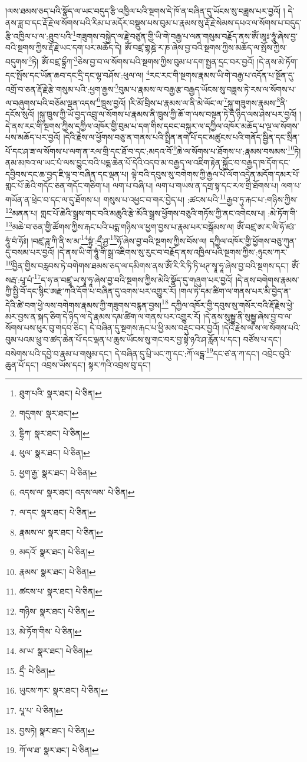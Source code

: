 །ལས་ཐམས་ཅད་པའི་སྣོད་ལ་ཡང་བདུད་རྩི་འཁྱིལ་པའི་སྔགས་དེ་ཁོ་ན་བཞིན་དུ་ཡོངས་སུ་བཟླས་པར་བྱའོ། །
དེ་ནས་ཟླ་བ་དང་རྡོ་རྗེ་ལ་སོགས་པའི་རིམ་པ་མདོར་བསྡུས་པས་བུམ་པ་རྣམས་སུ་རྡོ་རྗེ་སེམས་དཔའ་ལ་སོགས་པ་བདུད་རྩི་འཁྱིལ་པ་ལ་:ཐུབ་པའི་\footnote{ཐུག་པའི་  སྣར་ཐང་།  པེ་ཅིན། }གཟུགས་བསྐྱེད་ལ་རྗེ་བཙུན་གྱི་ཡི་གེ་བརྒྱ་པ་ལན་གསུམ་བརྗོད་ནས་ཨོཾ་ཨཱཿ་ཧཱུཾ་ཞེས་བྱ་བའི་སྔགས་ཀྱིས་རྡོ་རྗེ་ཡང་དག་པར་མཆོད་དེ། ཨོཾ་བཛྲ་གྷཎྜེ་ར་ཎ་ཞེས་བྱ་བའི་སྔགས་ཀྱིས་མཆོད་ལ་སྤོས་ཀྱིས་བདུགས་\footnote{གདུགས་  སྣར་ཐང་། }ཏེ། ཨོཾ་བཛྲ་དྷྲྀཀ་\footnote{དྷྲིཀ་  སྣར་ཐང་།  པེ་ཅིན། }ཅེས་བྱ་བ་ལ་སོགས་པའི་སྔགས་ཀྱིས་བུམ་པ་དག་སྤྱན་དྲང་བར་བྱའོ། །དེ་ནས་མེ་ཏོག་དང་སྤོས་དང་ཡོན་ཆབ་དང་དྲི་དང་ལྷ་བཤོས་:ཕུལ་ལ། \footnote{ཕུལ་  སྣར་ཐང་།  པེ་ཅིན། }རང་རང་གི་སྔགས་རྣམས་ཡི་གེ་བརྒྱ་པ་འདོན་པ་སྔོན་དུ་འགྲོ་བ་ཅན་རྡོ་རྗེ་རྩེ་གསུམ་པའི་:ཕྱག་རྒྱས་\footnote{ཕྱག་རྒྱ་  སྣར་ཐང་།  པེ་ཅིན། }བུམ་པ་རྣམས་ལ་བརྒྱ་རྩ་བརྒྱད་ཡོངས་སུ་བཟླས་ཏེ་རས་ལ་སོགས་པ་ལ་བཞུགས་པའི་བཅོམ་ལྡན་འདས་\footnote{འདས་ལ་  སྣར་ཐང་། འདས་ལས་  པེ་ཅིན། }ཁྲུས་བྱའོ། །རི་མོ་བྲིས་པ་རྣམས་ལ་ནི་མེ་ལོང་ལ་\footnote{ལ་དང་  སྣར་ཐང་།  པེ་ཅིན། }སྐུ་གཟུགས་རྣམས་\footnote{རྣམས་ལ་  སྣར་ཐང་།  པེ་ཅིན། }ནི་དངོས་སུའོ། །སྐུ་ཁྲུས་ཀྱི་ཡོ་བྱད་འབྲུ་ལ་སོགས་པ་རྣམས་ནི་ཁྲུས་ཀྱི་ཆོ་ག་ལས་བསྟན་ཏེ་དེ་ཉིད་ལས་ཤེས་པར་བྱའོ། །དེ་ནས་རང་གི་སྔགས་ཀྱིས་དཀྱིལ་འཁོར་གྱི་བུམ་པ་དག་གིས་དབང་བསྐུར་ལ་དཀྱིལ་འཁོར་མཆོད་པ་ལྔ་ལ་སོགས་པས་མཆོད་པར་བྱའོ། །དེའི་རྗེས་ལ་ཕྱོགས་བཅུ་ན་གནས་པའི་སྤྲིན་ནག་པོ་དང་མཚུངས་པའི་གནོད་སྦྱིན་དང་སྲིན་པོ་དང་ཤ་ཟ་ལ་སོགས་པ་ལག་ན་རལ་གྲི་དང་ཐོ་བ་དང་:མདའ་བོ་\footnote{མདའོ་  སྣར་ཐང་།  པེ་ཅིན། }ཆེ་ལ་སོགས་པ་ཐོགས་པ་:རྣམས་བསམས་\footnote{རྣམས་  སྣར་ཐང་།  པེ་ཅིན། }ཏེ། ནམ་མཁའ་ལ་ཡང་པཾ་ལས་བྱུང་བའི་པདྨ་ཆེན་པོ་དེའི་འདབ་མ་བརྒྱད་ལ་འཇིག་རྟེན་སྐྱོང་བ་བརྒྱད་ཁ་དོག་དང་དབྱིབས་དང་ཆ་བྱད་ཇི་ལྟ་བ་བཞིན་དང་ལྡན་པ། ལྟེ་བའི་དབུས་སུ་བགེགས་ཀྱི་རྒྱལ་པོ་ལོག་འདྲེན་མདོག་དམར་པོ་གླང་པོ་ཆེའི་གདོང་ཅན་གདོང་གཅིག་པ། ལག་པ་བཞི་པ། ལག་པ་གཡས་ན་དགྲ་སྟ་དང་རལ་གྲི་ཐོགས་པ། ལག་པ་གཡོན་ན་ཕྲེང་བ་དང་ལ་དུ་ཐོགས་པ། གསུས་པ་འཕྱང་བ་གར་བྱེད་པ། :ཚངས་པའི་\footnote{ཚངས་པ་  སྣར་ཐང་།  པེ་ཅིན། }རྒྱབ་ཏུ་རྐང་པ་:གཉིས་ཀྱིས་\footnote{གཉིས་  སྣར་ཐང་།  པེ་ཅིན། }མནན་པ། གླང་པོ་ཆེའི་སྒྲས་གང་བའི་མཆུའི་རྩེ་མོའི་སྒྲས་ཕྱོགས་བཅུའི་གཏོས་ཀྱི་ནང་འགེངས་པ། :མེ་ཏོག་གི་\footnote{མེ་ཏོག་གིས་  པེ་ཅིན། }མཆེ་བ་ཅན་གྱི་ཚོགས་ཀྱིས་རྐང་པའི་པདྨ་གཉིས་ལ་ཕྱག་བྱས་པ་རྣམ་པར་བསྒོམས་ལ། ཨོཾ་བཛྲ་ཨ་ར་ལི་ཧོ་ཛཿ་ཧཱུཾ་བཾ་ཧོཿ། །བཛྲ་ཌཱ་ཀི་ནི་ས་མ་\footnote{མ་ཡ་  སྣར་ཐང་།  པེ་ཅིན། }སྟྭཾ་:དྲྀ་ཤྱ་\footnote{དྲྀ་  པེ་ཅིན། }ཧོ་ཞེས་བྱ་བའི་སྔགས་ཀྱིས་བོས་ལ། དཀྱིལ་འཁོར་གྱི་ཕྱོགས་བཅུ་ཀུན་དུ་བསམ་པར་བྱའོ། །དེ་ནས་ཡི་གེ་ཧཱུཾ་གི་སྒྲ་འཇིགས་སུ་རུང་བ་བརྗོད་ནས་འཁྱིལ་པའི་སྔགས་ཀྱིས་:ཉུངས་ཀར་\footnote{ཡུངས་ཀར་  སྣར་ཐང་།  པེ་ཅིན། }བྱིན་གྱིས་བརླབས་ཏེ་བགེགས་ཐམས་ཅད་ལ་དམིགས་ནས་ཨོཾ་རི་རི་ཏི་ཏི་ཕཊ་སྭཱ་ཧཱ་ཞེས་བྱ་བའི་སྔགས་དང་། ཨོཾ་སརྦ་:པཱ་པཾ་\footnote{པཱ་པ་  པེ་ཅིན། }ད་ཧ་ན་བཛྲཱ་ཡ་སྭཱ་ཧཱ་ཞེས་བྱ་བའི་སྔགས་ཀྱིས་མེའི་སྣོད་དུ་གཞུག་པར་བྱའོ། །དེ་ནས་བགེགས་རྣམས་ཀྱི་སྤྱི་བོ་དང་སྙིང་ཨརྫ་ཀའི་དོག་པ་བཞིན་དུ་འགས་པར་འགྱུར་རོ། །གལ་ཏེ་དམ་ཚིག་ལ་གནས་པར་མི་བྱེད་ན་དེའི་ཚེ་བག་ཕྱེ་ལས་བགེགས་རྣམས་ཀྱི་གཟུགས་བརྙན་བྱས།\footnote{བྱསཏེ།  སྣར་ཐང་།  པེ་ཅིན། } དཀྱིལ་འཁོར་གྱི་དབུས་སུ་གསོར་བའི་རྡོ་རྗེས་ཕྱེ་མར་བྱས་ན་སྐད་ཅིག་དེ་ཉིད་ལ་དེ་རྣམས་དམ་ཚིག་ལ་གནས་པར་འགྱུར་རོ། །དེ་ནས་སུམྦྷ་ནི་སུམྦྷ་ཞེས་བྱ་བ་ལ་སོགས་པས་ཕུར་བུ་གདབ་ཅིང་། དེ་བཞིན་དུ་སྔགས་རྐང་པ་ཕྱི་མས་བརྡུང་བར་བྱའོ། །དེའི་རྗེས་ལ་ས་ལ་སོགས་པའི་བུམ་པའམ་ཕྲུ་བ་ཚད་ཆེན་པོ་དང་ལྡན་པ་ཆུས་ཡོངས་སུ་གང་བར་བྱ་སྟེ་ཉའི་ཤ་རློན་པ་དང་། བཙོས་པ་དང་། བསེགས་པའི་དབྱེ་བ་རྣམ་པ་གསུམ་དང་། དེ་བཞིན་དུ་པྲི་ཡང་ཀུ་དང་:ཀོ་ལདྠ་\footnote{ཀོ་ལ་ཐ་  སྣར་ཐང་།  པེ་ཅིན། }དང་ཙ་ན་ཀ་དང་། འབྲེང་བུའི་ཆུན་པོ་དང་། འབྲས་ཡོས་དང་། སྟར་ཀའི་འབྲས་བུ་དང་། 